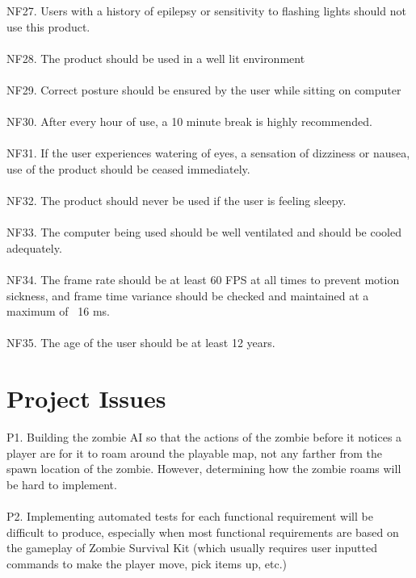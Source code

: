 \documentclass[12pt, titlepage]{article}
\begin{document}
{\color{magenta} NF27.} Users with a history of epilepsy or sensitivity to flashing lights should not use this product.
\\\\
{\color{magenta} NF28.} The product should be used in a well lit environment
\\\\
{\color{magenta} NF29.} Correct posture should be ensured by the user while sitting on computer
\\\\
{\color{magenta} NF30.} After every hour of use, a 10 minute break is highly recommended.
\\\\
{\color{magenta} NF31.} If the user experiences watering of eyes, a sensation of dizziness or nausea, use of the product should be ceased immediately.
\\\\
{\color{magenta} NF32.} The product should never be used if the user is feeling sleepy.
\\\\
{\color{magenta} NF33.} The computer being used should be well ventilated and should be cooled adequately.
\\\\
{\color{magenta} NF34.} The frame rate should be at least 60 FPS at all times to prevent motion sickness, and frame time variance should be checked and maintained at a maximum of ~16 ms.
\\\\
{\color{magenta} NF35.} The age of the user should be at least 12 years.


\section{Project Issues}
{\color{magenta} P1.} Building the zombie AI so that the actions of the zombie before it notices a player are for it to roam around the playable map, not any farther from the spawn location of the zombie. However, determining how the zombie roams will be hard to implement. 
\\\\
{\color{magenta} P2.} Implementing automated tests for each functional requirement will be difficult to produce, especially when most functional requirements are based on the gameplay of Zombie Survival Kit (which usually requires user inputted commands to make the player move, pick items up, etc.)
\end{document}
